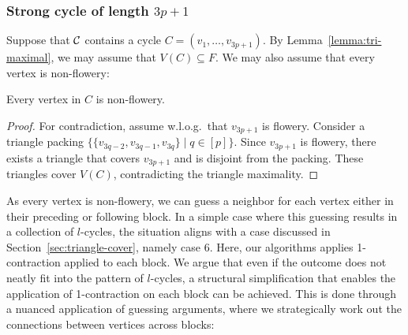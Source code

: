 \subsubsection{Strong cycle of length $3p + 1$} \label{sssec:1mod3}

Suppose that $\mathcal C$ contains a cycle $C = (v_{1}, \dots, v_{3p+1})$.
By Lemma~\ref{lemma:tri-maximal}, we may assume that $V(C) \subseteq F$.
We may also assume that every vertex is non-flowery:

\begin{lemma} \label{lemma:1mod3:non-flowery}
  Every vertex in $C$ is non-flowery.
\end{lemma}
\begin{proof}
  For contradiction, assume w.l.o.g.\ that $v_{3p + 1}$ is flowery.
  Consider a triangle packing $\{ \{ v_{3q-2}, \allowbreak v_{3q-1}, v_{3q} \} \mid q \in [p] \}$.
  Since $v_{3p+1}$ is flowery, there exists a triangle that covers $v_{3p+1}$ and is disjoint from the packing.
  These triangles cover $V(C)$, contradicting the triangle maximality.
\end{proof}

As every vertex is non-flowery, we can guess a neighbor for each vertex either in their preceding or following block.
In a simple case where this guessing results in a collection of $l$-cycles, the situation aligns with a case discussed in Section~\ref{sec:triangle-cover}, namely case 6.
Here, our algorithms applies 1-contraction applied to each block.
We argue that even if the outcome does not neatly fit into the pattern of $l$-cycles, a structural simplification that enables the application of 1-contraction on each block can be achieved.
This is done through a nuanced application of guessing arguments, where we strategically work out the connections between vertices across blocks:

